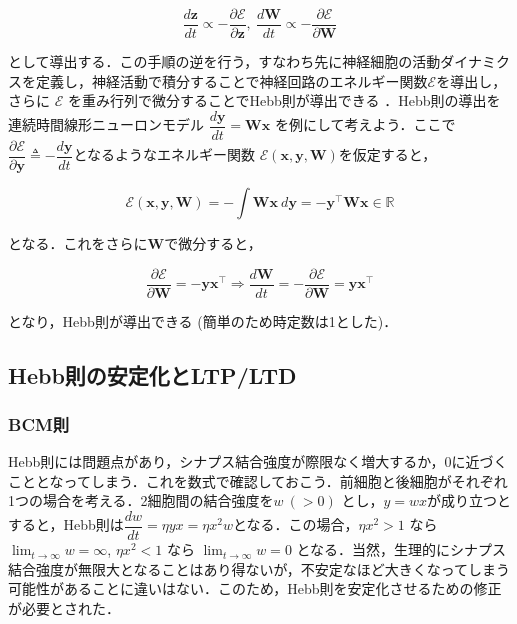 \begin{equation}
\frac{d \mathbf{z}}{dt}\propto-\frac{\partial \mathcal{E}}{\partial \mathbf{z}},\ \frac{d \mathbf{W}}{dt}\propto-\frac{\partial \mathcal{E}}{\partial \mathbf{W}}
\end{equation}


として導出する．この手順の逆を行う，すなわち先に神経細胞の活動ダイナミクスを定義し，神経活動で積分することで神経回路のエネルギー関数$\mathcal{E}$を導出し，さらに $\mathcal{E}$ を重み行列で微分することでHebb則が導出できる \cite{Isomura2020-sn}．Hebb則の導出を連続時間線形ニューロンモデル $\dfrac{d\mathbf{y}}{dt}=\mathbf{W}\mathbf{x}$ を例にして考えよう．ここで$\dfrac{\partial\mathcal{E}}{\partial\mathbf{y}}\triangleq-\dfrac{d\mathbf{y}}{dt}$となるようなエネルギー関数 $\mathcal{E}(\mathbf{x}, \mathbf{y}, \mathbf{W})$を仮定すると，


\begin{equation}
\mathcal{E}(\mathbf{x}, \mathbf{y}, \mathbf{W})=-\int \mathbf{W}\mathbf{x}\ d\mathbf{y}=-\mathbf{y}^\top \mathbf{W}\mathbf{x} \in \mathbb{R}
\end{equation}


となる．これをさらに$\mathbf{W}$で微分すると，


\begin{equation}
\dfrac{\partial\mathcal{E}}{\partial\mathbf{W}}=-\mathbf{y}\mathbf{x}^\top\Rightarrow
\frac{d\mathbf{W}}{dt}=-\dfrac{\partial\mathcal{E}}{\partial\mathbf{W}}=\mathbf{y}\mathbf{x}^\top
\end{equation}


となり，Hebb則が導出できる (簡単のため時定数は1とした)．
\subsection{Hebb則の安定化とLTP/LTD}
\subsubsection{BCM則}
Hebb則には問題点があり，シナプス結合強度が際限なく増大するか，0に近づくこととなってしまう．これを数式で確認しておこう．前細胞と後細胞がそれぞれ1つの場合を考える．2細胞間の結合強度を$w\ (>0)$ とし，$y=wx$が成り立つとすると，Hebb則は$\dfrac{dw}{dt}=\eta yx=\eta x^2w$となる．この場合，$\eta x^2>1$ なら $\lim_{t\to\infty} w= \infty$, $\eta x^2<1$ なら $\lim_{t\to\infty} w= 0$ となる．当然，生理的にシナプス結合強度が無限大となることはあり得ないが，不安定なほど大きくなってしまう可能性があることに違いはない．このため，Hebb則を安定化させるための修正が必要とされた．

